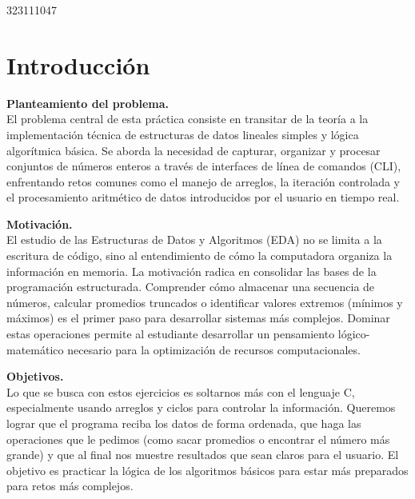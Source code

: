 323111047

\section{Introducción}

\textbf{Planteamiento del problema.} \\
El problema central de esta práctica consiste en transitar de la teoría a la implementación técnica de estructuras de datos lineales simples y lógica algorítmica básica. Se aborda la necesidad de capturar, organizar y procesar conjuntos de números enteros a través de interfaces de línea de comandos (CLI), enfrentando retos comunes como el manejo de arreglos, la iteración controlada y el procesamiento aritmético de datos introducidos por el usuario en tiempo real.

\vspace{0.4cm}

\textbf{Motivación.} \\
El estudio de las Estructuras de Datos y Algoritmos (EDA) no se limita a la escritura de código, sino al entendimiento de cómo la computadora organiza la información en memoria. La motivación radica en consolidar las bases de la programación estructurada. Comprender cómo almacenar una secuencia de números, calcular promedios truncados o identificar valores extremos (mínimos y máximos) es el primer paso para desarrollar sistemas más complejos. Dominar estas operaciones permite al estudiante desarrollar un pensamiento lógico-matemático necesario para la optimización de recursos computacionales.

\vspace{0.4cm}

\textbf{Objetivos.} \\
Lo que se busca con estos ejercicios es soltarnos más con el lenguaje C, especialmente usando arreglos y ciclos para controlar la información. Queremos lograr que el programa reciba los datos de forma ordenada, que haga las operaciones que le pedimos (como sacar promedios o encontrar el número más grande) y que al final nos muestre resultados que sean claros para el usuario. El objetivo es practicar la lógica de los algoritmos básicos para estar más preparados para retos más complejos.